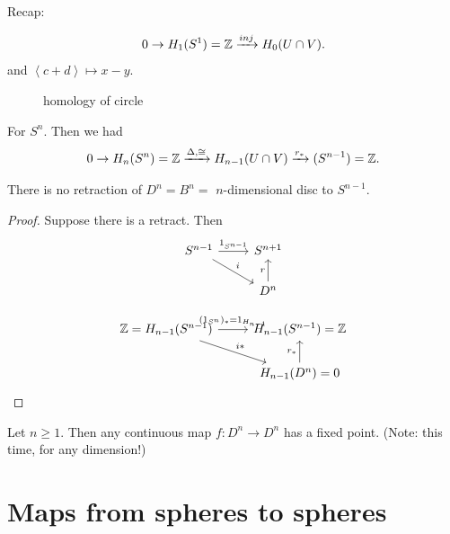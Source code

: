 
Recap: 

\[
    0 \to H_1(S^1) = \mathbb{Z} \xrightarrow{inj} H_0(U \cap V)
.\] 
and $\left<c + d \right> \mapsto x-y$.

\begin{figure}[H]
    \centering
    \caption{homology of circle}
    \label{fig:homology-of-circle}
\end{figure}

For $S^{n}$.
Then we had
\[
    0 \to  H_n(S^{n}) = \mathbb{Z} \xrightarrow{\Delta, \cong}  H_{n-1}(U \cap  V) \xrightarrow{r_*} (S^{n-1}) = \mathbb{Z}
.\] 


\begin{corollary}
    There is no retraction of $D^{n} = B^{n} = $ $n$-dimensional disc to $S^{n-1}$.
\end{corollary}
\begin{proof}
    Suppose there is a retract.
    Then
    \[
        \begin{tikzcd}
            S^{n-1} \arrow[dr, "i"]  \arrow[r, "1_{S^{n-1}}"] &S^{n+1}\\
                                    & D^{n} \arrow[u, "r"]
        \end{tikzcd}
    \]

    \[
        \begin{tikzcd}
            \Z = H_{n-1}(S^{n-1}) \arrow[dr, "i*"] \arrow[r, "(1_{S^{n}})_* = 1_{H_{n-1}}"] & H_{n-1}(S^{n-1}) = \Z\\
                                           & H_{n-1}(D^{n}) = 0 \arrow[u, "r_*"]
        \end{tikzcd}
    \]
\end{proof}
\begin{corollary}
    Let $n\ge 1$.
    Then any continuous map $f: D^{n} \to D^{n}$ has a fixed point. (Note: this time, for any dimension!)
\end{corollary}

\section*{Maps from spheres to spheres}

